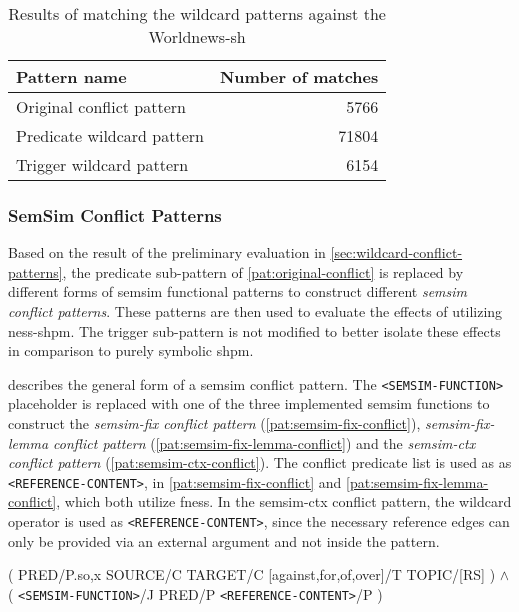 \documentclass[11pt]{scrreprt}
\begin{document}
{\begin{table}[h]
\centering
\begin{tabular}{lr}
\toprule
\multicolumn{1}{l}{Pattern name}				& \multicolumn{1}{l}{Number of matches} \\
\midrule
Original conflict pattern					& 5766	\\
Predicate wildcard pattern					& 71804 \\
Trigger wildcard pattern						& 6154	\\
\bottomrule
\end{tabular}
\caption{Results of matching the wildcard patterns against the Worldnews-\gls{sh}}
\label{tab:wildcard-pattern-evaluation}
\end{table}



\subsubsection{SemSim Conflict Patterns}
Based on the result of the preliminary evaluation in \cref{sec:wildcard-conflict-patterns}, the predicate sub-pattern of \cref{pat:original-conflict} is replaced by different forms of semsim functional patterns to construct different \textit{semsim conflict patterns}. These patterns are then used to evaluate the effects of utilizing \gls{ness-shpm}. The trigger sub-pattern is not modified to better isolate these effects in comparison to purely symbolic \gls{shpm}.

 describes the general form of a semsim conflict pattern. The \texttt{<SEMSIM-FUNCTION>} placeholder is replaced with one of the three implemented semsim functions to construct the \textit{semsim-fix conflict pattern} (\cref{pat:semsim-fix-conflict}), \textit{semsim-fix-lemma conflict pattern} (\cref{pat:semsim-fix-lemma-conflict}) and the \textit{semsim-ctx conflict pattern} (\cref{pat:semsim-ctx-conflict}). The conflict predicate list is used as as \texttt{<REFERENCE-CONTENT>}, in \cref{pat:semsim-fix-conflict} and \cref{pat:semsim-fix-lemma-conflict}, which both utilize \gls{fness}. In the semsim-ctx conflict pattern, the wildcard operator is used as \texttt{<REFERENCE-CONTENT>}, since the necessary reference edges can only be provided via an external argument and not inside the pattern.


\begin{pattern}[H]
  \normalfont\sffamily
  \centering
  ( PRED/P.{so,x} SOURCE/C TARGET/C [against,for,of,over]/T TOPIC/[RS] ) \(\wedge\)\\ 
  ( \texttt{<SEMSIM-FUNCTION>}/J PRED/P \texttt{<REFERENCE-CONTENT>}/P )
  \caption{General SemSim conflict pattern}
  \label{pat:semsim-conflict}
\end{pattern}

}
\end{document}
